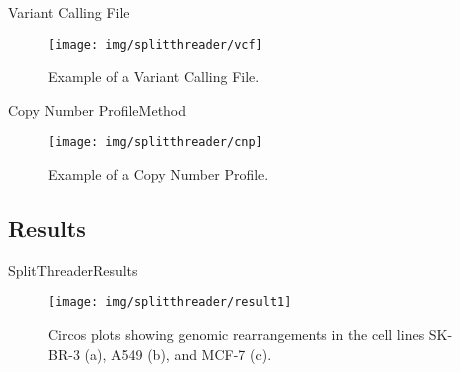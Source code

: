 \documentclass[10pt]{beamer}
\newcommand{\1}{
        	\setbeamertemplate{background}{
        		\texttt{[image: img/1\_BIO]}
        		\tikz[overlay] \fill[fill opacity=0.75,fill=white] (0,0) rectangle (-\paperwidth,\paperheight);
        	}
}
\begin{document}
\begin{frame}{Variant Calling File}{}	
	\begin{figure}[h]
		\centering
		\texttt{[image: img/splitthreader/vcf]}
		\caption{Example of a Variant Calling File.}
	\end{figure}
\end{frame}

\begin{frame}{Copy Number Profile}{Method}	
	\begin{figure}[h]
		\centering
		\texttt{[image: img/splitthreader/cnp]}
		\caption{Example of a Copy Number Profile.}
	\end{figure}
\end{frame}



\subsection{Results}

\begin{frame}{SplitThreader}{Results}	
	\begin{figure}
		\centering
		\texttt{[image: img/splitthreader/result1]}
		\caption{ Circos plots showing genomic rearrangements in the cell lines SK-BR-3 (a), A549 (b), and MCF-7 (c).}
	\end{figure}
\end{frame}
\end{document}
